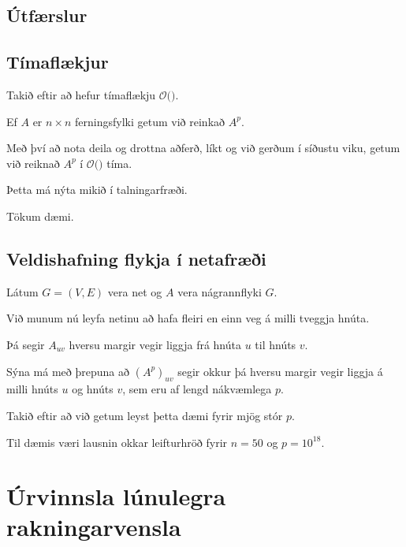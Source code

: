 \subsection{Útfærslur}
{
}

\subsection{Tímaflækjur}
{
    {
        \item<1-> Takið eftir að  hefur tímaflækju $\mathcal{O}($$)$.
        \item<3-> Ef $A$ er $n \times n$ ferningsfylki getum við reinkað $A^p$.
        \item<4-> Með því að nota deila og drottna aðferð, líkt og við gerðum í síðustu viku, getum við reiknað $A^p$ í
            $\mathcal{O}($$)$ tíma.
        \item<6-> Þetta má nýta mikið í talningarfræði.
        \item<7-> Tökum dæmi.
    }
}

\subsection{Veldishafning flykja í netafræði}
{
    {
        \item<1-> Látum $G = (V, E)$ vera net og $A$ vera nágrannflyki $G$.
        \item<2-> Við munum nú leyfa netinu að hafa fleiri en einn veg á milli tveggja hnúta.
        \item<3-> Þá segir $A_{uv}$ hversu margir vegir liggja frá hnúta $u$ til hnúts $v$.
        \item<4-> Sýna má með þrepuna að $(A^p)_{uv}$ segir okkur þá hversu margir vegir liggja á milli hnúts $u$ og hnúts $v$,
                sem eru af lengd nákvæmlega $p$.
        \item<5-> Takið eftir að við getum leyst þetta dæmi fyrir mjög stór $p$.
        \item<6-> Til dæmis væri lausnin okkar leifturhröð fyrir $n = 50$ og $p = 10^{18}$.
    }
}

\section{Úrvinnsla lúnulegra rakningarvensla}
